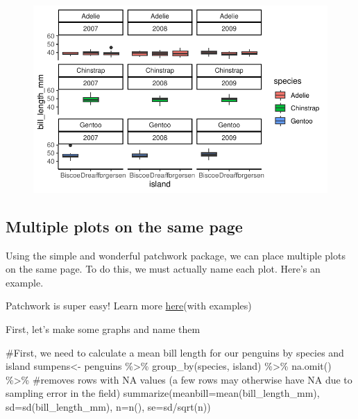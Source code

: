 \documentclass[
  letterpaper,
  DIV=11,
  numbers=noendperiod]{scrartcl}
\newenvironment{Shaded}{\begin{snugshade}}{\end{snugshade}}
\newcommand{\AttributeTok}[1]{\textcolor[rgb]{0.40,0.45,0.13}{#1}}
\newcommand{\CommentTok}[1]{\textcolor[rgb]{0.37,0.37,0.37}{#1}}
\newcommand{\FunctionTok}[1]{\textcolor[rgb]{0.28,0.35,0.67}{#1}}
\newcommand{\NormalTok}[1]{\textcolor[rgb]{0.00,0.23,0.31}{#1}}
\newcommand{\OtherTok}[1]{\textcolor[rgb]{0.00,0.23,0.31}{#1}}
\newcommand{\SpecialCharTok}[1]{\textcolor[rgb]{0.37,0.37,0.37}{#1}}
\begin{document}
\begin{figure}[H]

{\centering \includegraphics{Lab_2_files/figure-pdf/unnamed-chunk-36-1.pdf}

}

\end{figure}

\subsection{\texorpdfstring{\textbf{Multiple plots on the same
page}}{Multiple plots on the same page}}

Using the simple and wonderful patchwork package, we can place multiple
plots on the same page. To do this, we must actually name each plot.
Here's an example.

Patchwork is super easy! Learn more
\href{https://patchwork.data-imaginist.com/articles/patchwork.html}{here}(with
examples)

First, let's make some graphs and name them

\begin{Shaded}
\begin{Highlighting}[]
\CommentTok{\#First, we need to calculate a mean bill length for our penguins by species and island}
\NormalTok{sumpens}\OtherTok{\textless{}{-}}\NormalTok{ penguins }\SpecialCharTok{\%\textgreater{}\%}
  \FunctionTok{group\_by}\NormalTok{(species, island) }\SpecialCharTok{\%\textgreater{}\%}
  \FunctionTok{na.omit}\NormalTok{() }\SpecialCharTok{\%\textgreater{}\%} \CommentTok{\#removes rows with NA values (a few rows may otherwise have NA due to sampling error in the field)}
  \FunctionTok{summarize}\NormalTok{(}\AttributeTok{meanbill=}\FunctionTok{mean}\NormalTok{(bill\_length\_mm), }\AttributeTok{sd=}\FunctionTok{sd}\NormalTok{(bill\_length\_mm), }\AttributeTok{n=}\FunctionTok{n}\NormalTok{(), }\AttributeTok{se=}\NormalTok{sd}\SpecialCharTok{/}\FunctionTok{sqrt}\NormalTok{(n))}
\end{Highlighting}
\end{Shaded}
\end{document}
